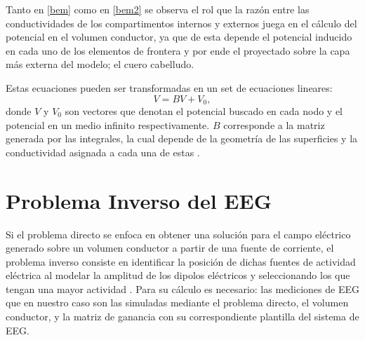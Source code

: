 Tanto en \cref{bem} como en \cref{bem2} se observa el rol que la razón entre las conductividades de los compartimentos internos y externos juega en el cálculo del potencial en el volumen conductor, ya que de esta depende el potencial inducido en cada uno de los elementos de frontera y por ende el proyectado sobre la capa más externa del modelo; el cuero cabelludo.

Estas ecuaciones pueden ser transformadas en un set de ecuaciones lineares:
\begin{equation}
	\label{lineal}
	V = BV + V_{0},
\end{equation}
donde $V$ y $V_{0}$ son vectores que denotan el potencial buscado en cada nodo y el potencial en un medio infinito respectivamente. 
$B$ corresponde a la matriz generada por las integrales, la cual depende de la geometría de las superficies y la conductividad asignada a cada una de estas \cite{Hallez2007}.

\section{Problema Inverso del EEG}
\label{sec:intro:inverse}

Si el problema directo se enfoca en obtener una solución para el campo eléctrico generado sobre un volumen conductor a partir de una fuente de corriente, el problema inverso consiste en identificar la posición de dichas fuentes de actividad eléctrica al modelar la amplitud de los dipolos eléctricos y seleccionando los que tengan una mayor actividad \cite{Baillet2001}. 
Para su cálculo es necesario: las mediciones de EEG que en nuestro caso son las simuladas mediante el problema directo, el volumen conductor, y la matriz de ganancia con su correspondiente plantilla del sistema de EEG.

